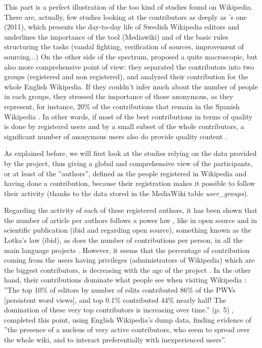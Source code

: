 
This part is a perfect illustration of the too kind of studies found
on Wikipedia. There are, actually, few studies looking at the contributors
as deeply as \citeauthor{Sundin11}'s one (2011), which presents the
day-to-day life of Swedish Wikipedia editors and underlines the importance
of the tool (Mediawiki) and of the basic rules structuring the tasks
(vandal fighting, verification of sources, improvement of sourcing...)
On the other side of the spectrum, \citet{AnthonySmithWilliamson09}
proposed a quite macroscopic, but also more comprehensive point of
view: they separated the contributors into two groups (registered
and non registered), and analyzed their contribution for the whole
English Wikipedia. If they couldn't infer much about the number of
people in each groups, they stressed the importance of those anonymous,
as they represent, for instance, 20\% of the contributions that remain
in the Spanish Wikipedia \citep{DruckMiklauMcCallum08}. In other
words, if most of the best contributions in terms of quality is done
by registered users and by a small subset of the whole contributors,
a significant number of anonymous users also do provide quality content
\citep{Javanmardietal09}.


As explained before, we will first look at the studies relying on
the data provided by the project, thus giving a global and comprehensive
view of the participants, or at least of the \textquotedblright authors\textquotedblright ,
defined as the people registered in Wikipedia and having done a contribution,
because their registration makes it possible to follow their activity
(thanks to the data stored in the MediaWiki table \textit{user\_groups}).

Regarding the activity of each of these registered authors, it has
been shown that the number of article per authors follows a power
law \citep{Voss05}, like in open source and in scientific publication
(ibid and \citealp{Maillartetal08,ArafatRiehle09} regarding open
source), something known as the Lotka's law (ibid), as does the number
of contributions per person, in all the main language projects \citep{Kitturetal07b,OrtegaGonzalez-BarahonaRobles08,Ortega09,Javanmardietal09,Zhangetal10}.
However, it seems that the percentage of contribution coming from
the users having privileges (administrators of Wikipedia) which are
the biggest contributors, is decreasing with the age of the project
\citep{Kitturetal07b,Ortega07,Ortegaetal09}. In the other hand, their
contributions dominate what people see when visiting Wikipedia \citep{Priedhorskyetal07}:
''The top 10\% of editors by number of edits contributed 86\% of
the PWVs {[}persistent word views{]}, and top 0.1\% contributed 44\%
\textendash{} nearly half! The domination of these very top contributors
is increasing over time.'' (p. 5) \citet{LaniadoTasso11}, completed
this point, using English Wikipedia's dump data, finding evidence
of ''the presence of a nucleus of very active contributors, who seem
to spread over the whole wiki, and to interact preferentially with
inexperienced users''. 

